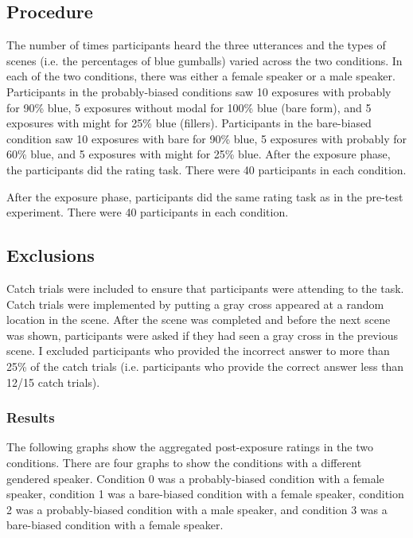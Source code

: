 \documentclass[lucida,biblatex]{sp} %
\begin{document}
\subsection{Procedure}
The number of times participants heard the three utterances and the types of scenes (i.e. the percentages of blue gumballs) varied across the two conditions. In each of the two conditions, there was either a female speaker or a male speaker. Participants in the probably-biased conditions saw 10 exposures with probably for 90\% blue, 5 exposures without modal for 100\% blue (bare form), and 5 exposures with might for 25\% blue (fillers). Participants in the bare-biased condition saw 10 exposures with bare for 90\% blue, 5 exposures with probably for 60\% blue, and 5 exposures with might for 25\% blue. 
After the exposure phase, the participants did the rating task. There were 40 participants in each condition. 


After the exposure phase, participants did the same rating task as in the pre-test experiment. There were 40 participants in each condition.

\subsection{Exclusions}
Catch trials were included to ensure that participants were attending to the task. Catch trials were implemented by putting a gray cross appeared at a random location in the scene. After the scene was completed and before the next scene was shown, participants were asked if they had seen a gray cross in the previous scene. I excluded participants who provided the incorrect answer to more than 25\% of the catch trials (i.e. participants who provide the correct answer less than 12/15 catch trials).


\subsubsection{Results}

The following graphs show the aggregated post-exposure ratings in the two conditions. There are four graphs to show the conditions with a different gendered speaker. Condition 0 was a probably-biased condition with a female speaker, condition 1 was a bare-biased condition with a female speaker, condition 2 was a probably-biased condition with a male speaker, and condition 3 was a bare-biased condition with a female speaker. 
\end{document}
